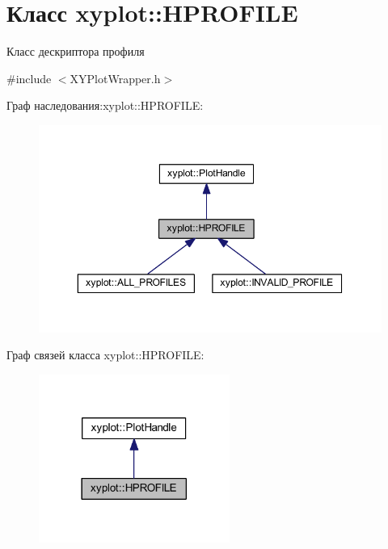 \hypertarget{classxyplot_1_1_h_p_r_o_f_i_l_e}{\section{Класс xyplot\-:\-:H\-P\-R\-O\-F\-I\-L\-E}
\label{classxyplot_1_1_h_p_r_o_f_i_l_e}
}


Класс дескриптора профиля  




{\ttfamily \#include $<$X\-Y\-Plot\-Wrapper.\-h$>$}



Граф наследования\-:xyplot\-:\-:H\-P\-R\-O\-F\-I\-L\-E\-:\nopagebreak
\begin{figure}[H]
\begin{center}
\leavevmode
\includegraphics[width=350pt]{classxyplot_1_1_h_p_r_o_f_i_l_e__inherit__graph}
\end{center}
\end{figure}


Граф связей класса xyplot\-:\-:H\-P\-R\-O\-F\-I\-L\-E\-:\nopagebreak
\begin{figure}[H]
\begin{center}
\leavevmode
\includegraphics[width=177pt]{classxyplot_1_1_h_p_r_o_f_i_l_e__coll__graph}
\end{center}
\end{figure}
